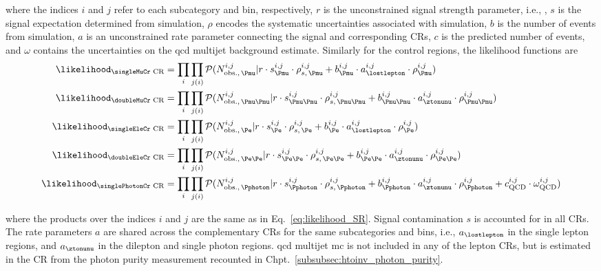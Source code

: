 where the indices $i$ and $j$ refer to each subcategory and \ptmiss bin, respectively, $r$ is the unconstrained signal strength parameter, i.e., \BRHinvFull, $s$ is the signal expectation determined from simulation, $\rho$ encodes the systematic uncertainties associated with simulation, $b$ is the number of events from simulation, $a$ is an unconstrained rate parameter connecting the signal and corresponding \glspl{CR}, $c$ is the predicted number of events, and $\omega$ contains the uncertainties on the \acrshort{qcd} multijet background estimate. Similarly for the control regions, the likelihood functions are
\begin{equation}
    \begin{aligned}
\likelihood_{\text{\singleMuCr CR}} &= \prod_{i} \prod_{j(i)} \mathcal{P}( N_{\mathrm{obs.}, \, \Pmu }^{i, j} | r \cdot s^{i, j}_{\Pmu} \cdot \rho_{s,\, \Pmu}^{i, j} + b_{\Pmu}^{i, j} \cdot a_{\lostlepton}^{i, j} \cdot \rho_{\Pmu}^{i, j} )\\
\likelihood_{\text{\doubleMuCr CR}} &= \prod_{i} \prod_{j(i)} \mathcal{P}( N_{\mathrm{obs.}, \, \Pmu\Pmu }^{i, j} | r \cdot s^{i, j}_{\Pmu\Pmu} \cdot \rho_{s,\, \Pmu\Pmu}^{i, j} + b_{\Pmu\Pmu}^{i, j} \cdot a_{\ztonunu}^{i, j} \cdot \rho_{\Pmu\Pmu}^{i, j} )\\
\likelihood_{\text{\singleEleCr CR}} &= \prod_{i} \prod_{j(i)} \mathcal{P}( N_{\mathrm{obs.}, \, \Pe }^{i, j} | r \cdot s^{i, j}_{\Pe} \cdot \rho_{s,\, \Pe}^{i, j} + b_{\Pe}^{i, j} \cdot a_{\lostlepton}^{i, j} \cdot \rho_{\Pe}^{i, j} )\\
\likelihood_{\text{\doubleEleCr CR}} &= \prod_{i} \prod_{j(i)} \mathcal{P}( N_{\mathrm{obs.}, \, \Pe\Pe }^{i, j} | r \cdot s^{i, j}_{\Pe\Pe} \cdot \rho_{s,\, \Pe\Pe}^{i, j} + b_{\Pe\Pe}^{i, j} \cdot a_{\ztonunu}^{i, j} \cdot \rho_{\Pe\Pe}^{i, j} )\\
\likelihood_{\text{\singlePhotonCr CR}} &= \prod_{i} \prod_{j(i)} \mathcal{P}( N_{\mathrm{obs.}, \, \Pphoton }^{i, j} | r \cdot s^{i, j}_{\Pphoton} \cdot \rho_{s,\, \Pphoton}^{i, j} + b_{\Pphoton}^{i, j} \cdot a_{\ztonunu}^{i, j} \cdot \rho_{\Pphoton}^{i, j} + c_{\mathrm{QCD}}^{i, j} \cdot \omega_{\mathrm{QCD}}^{i, j} )
    \end{aligned}
    \label{eq:likelihood_CRs}
\end{equation}

where the products over the indices $i$ and $j$ are the same as in Eq.~\ref{eq:likelihood_SR}. Signal contamination $s$ is accounted for in all \glspl{CR}. The rate parameters $a$ are shared across the complementary \glspl{CR} for the same subcategories and \ptmiss bins, i.e., $a_{\lostlepton}$ in the single lepton regions, and $a_{\ztonunu}$ in the dilepton and single photon regions. \acrshort{qcd} multijet \acrshort{mc} is not included in any of the lepton \glspl{CR}, but is estimated in the \singlePhotonCr \gls{CR} from the photon purity measurement recounted in Chpt.~\ref{subsubsec:htoinv_photon_purity}.

